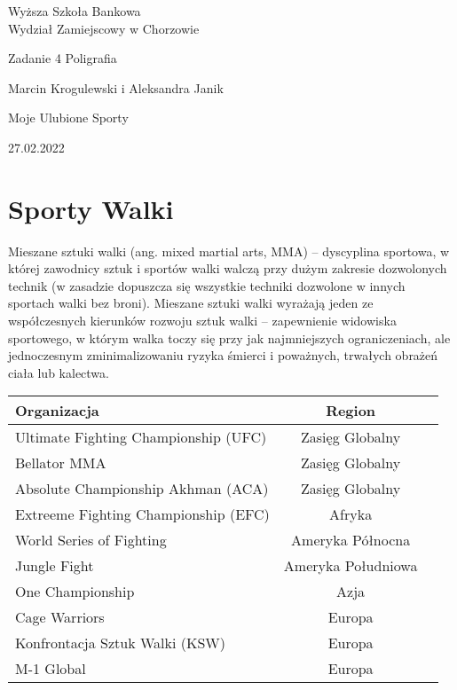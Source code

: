 \documentclass[14pt,oneside,a4paper]{book}
\theoremstyle{break}
\begin{document}
\thispagestyle{empty}
\begin{center}{\sc \Large
Wyższa Szkoła Bankowa\\
Wydział Zamiejscowy w Chorzowie}\par\vspace{0.2cm}\par
{\large
Zadanie 4 Poligrafia
}
\end{center}
\vspace{5cm}
\begin{center}
{\large
Marcin Krogulewski i Aleksandra Janik
}\par\vspace{0.2cm}\par
{\LARGE
Moje Ulubione Sporty
}
\end{center}
\vspace{4cm}
\begin{flushright}


\end{flushright}
\vfill
\begin{center}
27.02.2022
\end{center}

\newpage

\thispagestyle{empty} \setcounter{page}{0} \tableofcontents

\chapter*{Sporty Walki}


Mieszane sztuki walki (ang. mixed martial arts, MMA) – dyscyplina sportowa, w której zawodnicy sztuk i sportów walki walczą przy dużym zakresie dozwolonych technik (w zasadzie dopuszcza się wszystkie techniki dozwolone w innych sportach walki bez broni). Mieszane sztuki walki wyrażają jeden ze współczesnych kierunków rozwoju sztuk walki – zapewnienie widowiska sportowego, w którym walka toczy się przy jak najmniejszych ograniczeniach, ale jednoczesnym zminimalizowaniu ryzyka śmierci i poważnych, trwałych obrażeń ciała lub kalectwa.


\begin{tabular}{|lc|r|}

\hline
Organizacja & Region\\
\hline
Ultimate Fighting Championship (UFC) &  Zasięg Globalny\\
Bellator MMA &  Zasięg Globalny\\
Absolute Championship Akhman (ACA) &  Zasięg Globalny\\
Extreeme Fighting Championship (EFC) &  Afryka\\
World Series of Fighting &  Ameryka Północna\\
Jungle Fight &  Ameryka Południowa\\
One Championship &  Azja\\
Cage Warriors &  Europa\\
Konfrontacja Sztuk Walki (KSW) &  Europa\\
M-1 Global &  Europa\\
\hline
\end{tabular}
\end{document}
